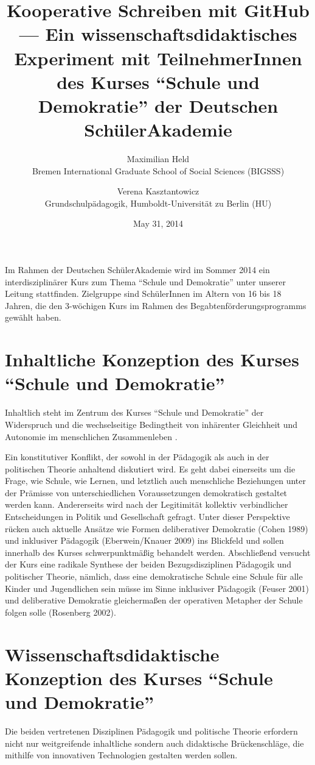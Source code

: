 \documentclass[11pt,a4paper,oneside]{article}
\title{
	Kooperative Schreiben mit GitHub ---
	Ein wissenschaftsdidaktisches Experiment mit TeilnehmerInnen des Kurses ``Schule und Demokratie'' der Deutschen SchülerAkademie
}
\date{May 31, 2014}
\author{
	Maximilian Held\\
	Bremen International Graduate School of Social Sciences (BIGSSS)
	\and
	Verena Kasztantowicz\\
	Grundschulpädagogik, Humboldt-Universität zu Berlin (HU)
}
\begin{document}
\maketitle

Im Rahmen der Deutschen SchülerAkademie wird im Sommer 2014 ein interdisziplinärer Kurs zum Thema ``Schule und Demokratie'' unter unserer Leitung stattfinden.
Zielgruppe sind SchülerInnen im Altern von 16 bis 18 Jahren, die den 3-wöchigen Kurs im Rahmen des Begabtenförderungsprogramms gewählt haben.

\section{Inhaltliche Konzeption des Kurses ``Schule und Demokratie''}

Inhaltlich steht im Zentrum des Kurses ``Schule und Demokratie'' der Widerspruch und die wechselseitige Bedingtheit von inhärenter Gleichheit und Autonomie im menschlichen Zusammenleben \cite{Habermas1999a}.

Ein konstitutiver Konflikt, der sowohl in der Pädagogik als auch in der politischen Theorie anhaltend diskutiert wird.
Es geht dabei einerseits um die Frage, wie Schule, wie Lernen, und letztlich auch menschliche Beziehungen unter der Prämisse von unterschiedlichen Voraussetzungen demokratisch gestaltet werden kann.
Andererseits wird nach der Legitimität kollektiv verbindlicher Entscheidungen in Politik und Gesellschaft gefragt.
Unter dieser Perspektive rücken auch aktuelle Ansätze wie Formen deliberativer Demokratie (Cohen 1989) und inklusiver Pädagogik (Eberwein/Knauer 2009) ins Blickfeld und sollen innerhalb des Kurses schwerpunktmäßig behandelt werden.
Abschließend versucht der Kurs eine radikale Synthese der beiden Bezugsdisziplinen Pädagogik und politischer Theorie, nämlich, dass eine demokratische Schule eine Schule für alle Kinder und Jugendlichen sein müsse im Sinne inklusiver Pädagogik (Feuser 2001) und deliberative Demokratie gleichermaßen der operativen Metapher der Schule folgen solle (Rosenberg 2002).

\section{Wissenschaftsdidaktische Konzeption des Kurses ``Schule und Demokratie''}

Die beiden vertretenen Disziplinen Pädagogik und politische Theorie erfordern nicht nur weitgreifende inhaltliche sondern auch didaktische Brückenschläge, die mithilfe von innovativen Technologien gestalten werden sollen.
\end{document}
